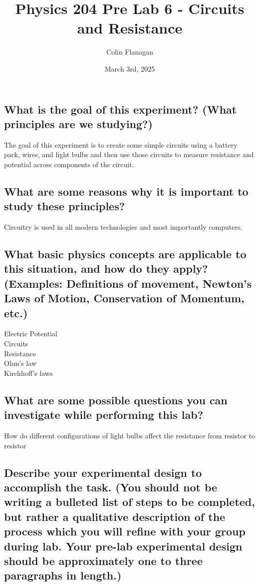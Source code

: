 \documentclass{article}
\title{Physics 204 Pre Lab 6 - Circuits and Resistance}
\author{Colin Flanagan}
\date{March 3rd, 2025}
\begin{document}
\maketitle

\subsection*{What is the goal of this experiment? (What principles are we studying?)}

    The goal of this experiment is to create some simple circuits using a battery pack, wires, and light bulbs and then use those circuits to measure resistance and potential across components of the circuit.

\subsection*{What are some reasons why it is important to study these principles?
}

  Circuitry is used in all modern technologies and most importantly computers. 
    
\subsection*{What basic physics concepts are applicable to this situation, and how do they apply? (Examples: Definitions of movement, Newton’s Laws of Motion, Conservation of Momentum, etc.)}

    Electric Potential\\

    Circuits\\

    Resistance\\

    Ohm's law\\

    Kirchhoff's laws\\
\subsection*{What are some possible questions you can investigate while performing this lab?
}

   How do different configurations of light bulbs affect the resistance from resistor to resistor\\

\subsection*{Describe your experimental design to accomplish the task. (You should not be writing a bulleted list of steps to be completed, but rather a qualitative description of the process which you will refine with your group during lab. Your pre-lab experimental design should be approximately one to three paragraphs in length.)}
\end{document}
